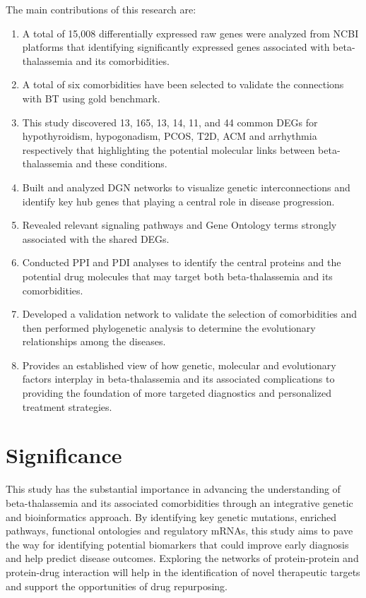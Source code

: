 The main contributions of this research are:


\begin{enumerate}[label=\arabic*)]
\item A total of 15,008 differentially expressed raw genes were analyzed from NCBI platforms that identifying significantly expressed genes associated with beta-thalassemia and its comorbidities.
\item A total of six comorbidities have been selected to validate the connections with BT using gold benchmark.
\item This study discovered 13, 165, 13, 14, 11, and 44 common DEGs for hypothyroidism, hypogonadism, PCOS, T2D, ACM and arrhythmia respectively that highlighting the potential molecular links between beta-thalassemia and these conditions.
\item Built and analyzed DGN networks to visualize genetic interconnections and identify key hub genes that playing a central role in disease progression.
\item Revealed relevant signaling pathways and Gene Ontology terms strongly associated with the shared DEGs.
\item Conducted PPI and PDI analyses to identify the central proteins and the potential drug molecules that may target both beta-thalassemia and its comorbidities.
\item Developed a validation network to validate the selection of comorbidities and then performed phylogenetic analysis to determine the evolutionary relationships among the diseases.
\item Provides an established view of how genetic, molecular and evolutionary factors interplay in beta-thalassemia and its associated complications to providing the foundation of more targeted diagnostics and personalized treatment strategies.
\end{enumerate}

\section{Significance}
\label{sec:sec01}

This study has the substantial importance in advancing the understanding of beta-thalassemia and its associated comorbidities through an integrative genetic and bioinformatics approach. By identifying key genetic mutations, enriched pathways, functional ontologies and regulatory mRNAs, this study aims to pave the way for identifying potential biomarkers that could improve early diagnosis and help predict disease outcomes. Exploring the networks of protein-protein and protein-drug interaction will help in the identification of novel therapeutic targets and support the opportunities of drug repurposing.


